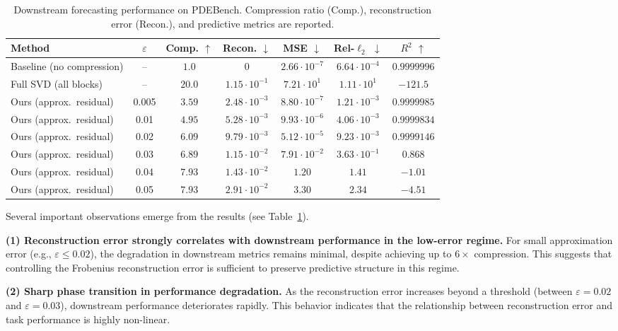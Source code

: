 \documentclass[10pt]{article} %
\begin{document}
\begin{table}[h]
\centering
\small
\begin{tabular}{lcccccc}
\toprule
Method & $\varepsilon$ & Comp. $\uparrow$ & Recon. $\downarrow$ & MSE $\downarrow$ & Rel-$\ell_2$ $\downarrow$ & $R^2$ $\uparrow$ \\
\midrule
Baseline (no compression) & -- & $1.0$ & $0$ & $2.66 \cdot 10^{-7}$ & $6.64 \cdot 10^{-4}$ & $0.9999996$ \\

Full SVD (all blocks) & -- & $20.0$ & $1.15 \cdot 10^{-1}$ & $7.21 \cdot 10^{1}$ & $1.11 \cdot 10^{1}$ & $-121.5$ \\

\midrule
Ours (approx.\ residual) & 0.005 & $3.59$ & $2.48 \cdot 10^{-3}$ & $8.80 \cdot 10^{-7}$ & $1.21 \cdot 10^{-3}$ & $0.9999985$ \\
Ours (approx.\ residual) & 0.01  & $4.95$ & $5.28 \cdot 10^{-3}$ & $9.93 \cdot 10^{-6}$ & $4.06 \cdot 10^{-3}$ & $0.9999834$ \\
Ours (approx.\ residual) & 0.02  & $6.09$ & $9.79 \cdot 10^{-3}$ & $5.12 \cdot 10^{-5}$ & $9.23 \cdot 10^{-3}$ & $0.9999146$ \\
Ours (approx.\ residual) & 0.03  & $6.89$ & $1.15 \cdot 10^{-2}$ & $7.91 \cdot 10^{-2}$ & $3.63 \cdot 10^{-1}$ & $0.868$ \\
Ours (approx.\ residual) & 0.04  & $7.93$ & $1.43 \cdot 10^{-2}$ & $1.20$ & $1.41$ & $-1.01$ \\
Ours (approx.\ residual) & 0.05  & $7.93$ & $2.91 \cdot 10^{-2}$ & $3.30$ & $2.34$ & $-4.51$ \\
\bottomrule
\end{tabular}
\caption{Downstream forecasting performance on PDEBench. Compression ratio (Comp.), reconstruction error (Recon.), and predictive metrics are reported.}
\label{tab:pdebench-downstream}
\end{table}

Several important observations emerge from the results (see Table~\ref{tab:pdebench-downstream}).

\textbf{(1) Reconstruction error strongly correlates with downstream performance in the low-error regime.}
For small approximation error (e.g., $\varepsilon \leq 0.02$), the degradation in downstream metrics remains minimal, despite achieving up to $6\times$ compression.
This suggests that controlling the Frobenius reconstruction error is sufficient to preserve predictive structure in this regime.

\textbf{(2) Sharp phase transition in performance degradation.}
As the reconstruction error increases beyond a threshold (between $\varepsilon=0.02$ and $\varepsilon=0.03$), downstream performance deteriorates rapidly.
This behavior indicates that the relationship between reconstruction error and task performance is highly non-linear.
\end{document}
